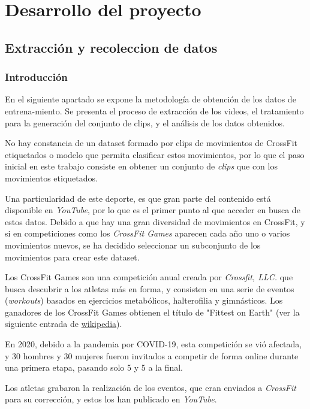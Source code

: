 \chapter{Desarrollo del proyecto}

\section{Extracción y recoleccion de datos}\label{extracción_recolección}

\subsection{Introducción}

En el siguiente apartado se expone la metodología de obtención de los datos de entrena-miento. Se presenta el proceso de extracción de los videos, el tratamiento para la generación del conjunto de clips, y el análisis de los datos obtenidos.

No hay constancia de un dataset formado por clips de movimientos de CrossFit etiquetados o modelo que permita clasificar estos movimientos, por lo que el paso inicial en este trabajo consiste en obtener un conjunto de \textit{clips} que con los movimientos etiquetados.

Una particularidad de este deporte, es que gran parte del contenido está disponible en \textit{YouTube}, por lo que es el primer punto al que acceder en busca de estos datos. Debido a que hay una gran diversidad de movimientos en CrossFit, y si en competiciones como los \textit{CrossFit Games} aparecen cada año uno o varios movimientos nuevos, se ha decidido seleccionar un subconjunto de los movimientos para crear este dataset.

Los CrossFit Games son una competición anual creada por \textit{Crossfit, LLC.} que busca descubrir a los atletas más en forma, y consisten en una serie de eventos (\textit{workouts}) basados en ejercicios metabólicos, halterofilia y gimnásticos. Los ganadores de los CrossFit Games obtienen el título de "Fittest on Earth" (ver la siguiente entrada de  \href{https://es.wikipedia.org/wiki/CrossFit_Games}{wikipedia}).

En 2020, debido a la pandemia por COVID-19, esta competición se vió afectada, y 30 hombres y 30 mujeres fueron invitados a competir de forma online durante una primera etapa, pasando solo 5 y 5 a la final.

Los atletas grabaron la realización de los eventos, que eran enviados a \textit{CrossFit} para su corrección, y estos los han publicado en \textit{YouTube}.



